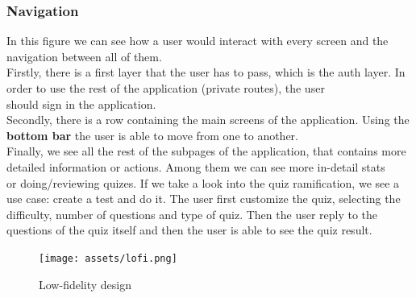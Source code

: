 \subsubsection{Navigation}
In this figure we can see how a user would interact with every screen and the navigation between all of them. \\

Firstly, there is a first layer that the user has to pass, which is the auth layer. In order to use the rest of the application (private routes), the user \\
should sign in the application. \\

Secondly, there is a row containing the main screens of the application. Using the \textbf{bottom bar} the user is able to move from one to another. \\

Finally, we see all the rest of the subpages of the application, that contains more detailed information or actions. Among them we can see more in-detail stats \\
or doing/reviewing quizes.
If we take a look into the quiz ramification, we see a use case: create a test and do it. The user first customize the quiz, selecting the difficulty, number of questions and type of quiz. Then the user reply to the questions of the quiz itself and then the user is able to see the quiz result.\\

\begin{figure}[H]
    \centering
        \texttt{[image: assets/lofi.png]}
    \caption{Low-fidelity design}
    \label{fig:design_lofi}
\end{figure}

